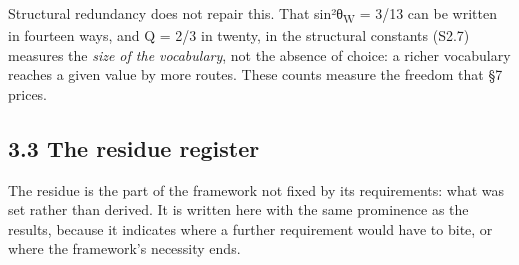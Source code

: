 \documentclass[11pt,a4paper]{article}
\begin{document}
Structural redundancy does not repair this. That sin²θ\textsubscript{W} = 3/13 can be written in fourteen ways, and Q = 2/3 in twenty, in the structural constants (S2.7) measures the \emph{size of the vocabulary}, not the absence of choice: a richer vocabulary reaches a given value by more routes. These counts measure the freedom that §7 prices.

\subsection{3.3 The residue register}\label{the-residue-register}

The residue is the part of the framework not fixed by its requirements: what was set rather than derived. It is written here with the same prominence as the results, because it indicates where a further requirement would have to bite, or where the framework's necessity ends.
\end{document}
